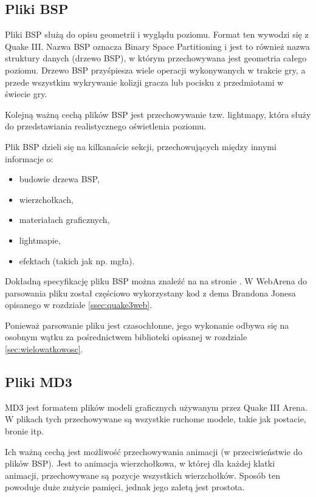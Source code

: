 \subsection{Pliki BSP}

Pliki BSP służą do opisu geometrii i wyglądu poziomu. Format ten wywodzi się z Quake III. Nazwa
BSP oznacza Binary Space Partitioning i jest to również nazwa struktury danych (drzewo BSP),
w którym przechowywana jest geometria całego poziomu.
Drzewo BSP przyśpiesza wiele operacji wykonywanych w trakcie gry, a przede wszystkim wykrywanie
kolizji gracza lub pocisku z przedmiotami w świecie gry.

Kolejną ważną cechą plików BSP jest przechowywanie tzw. lightmapy, która służy do przedstawiania
realistycznego oświetlenia poziomu.

Plik BSP dzieli się na kilkanaście sekcji, przechowujących między innymi informacje o:
\begin{itemize}
\item budowie drzewa BSP,
\item wierzchołkach,
\item materiałach graficznych,
\item lightmapie,
\item efektach (takich jak np. mgła).
\end{itemize}

Dokładną specyfikację pliku BSP można znaleźć na na stronie \cite{bsp}. W WebArena do parsowania
pliku został częściowo wykorzystany kod z dema Brandona Jonesa opisanego w rozdziale \ref{ssec:quake3web}.

Ponieważ parsowanie pliku jest czasochłonne, jego wykonanie odbywa się na osobnym
wątku za pośrednictwem biblioteki opisanej w rozdziale \ref{sec:wielowatkowosc}.

\subsection{Pliki MD3}

MD3 jest formatem plików modeli graficznych używanym przez Quake III Arena. W plikach tych przechowywane
są wszystkie ruchome modele, takie jak postacie, bronie itp.

Ich ważną cechą jest możliwość przechowywania
animacji (w przeciwieństwie do plików BSP). Jest to animacja wierzchołkowa, w której dla każdej klatki
animacji, przechowywane są pozycje wszystkich wierzchołków. Sposób ten powoduje duże zużycie pamięci,
jednak jego zaletą jest prostota.

